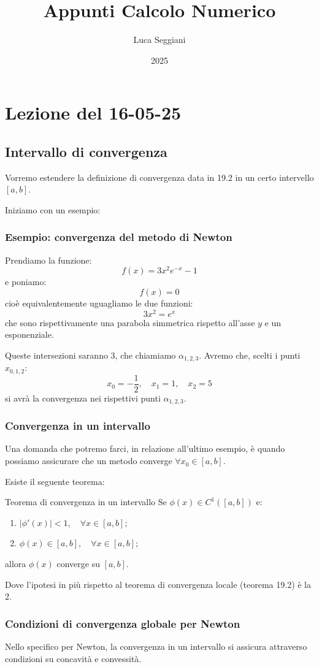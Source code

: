 \documentclass[a4paper,11pt]{article}
\title{Appunti Calcolo Numerico}
\author{Luca Seggiani}
\date{2025}
\begin{document}
\section{Lezione del 16-05-25}

\thispagestyle{empty}
\pagestyle{fancy}


\subsection{Intervallo di convergenza}
Vorremo estendere la definizione di convergenza data in 19.2 in un certo intervello $[a, b]$.

Iniziamo con un esempio:
\subsubsection{Esempio: convergenza del metodo di Newton}
Prendiamo la funzione:
$$
f(x) = 3 x^2 e^{-x} - 1
$$
e poniamo:
$$
f(x) = 0
$$
cioè equivalentemente uguagliamo le due funzioni:
$$
3x^2 = e^x
$$
che sono rispettivamente una parabola simmetrica rispetto all'asse $y$ e un esponenziale.

Queste intersezioni saranno 3, che chiamiamo $\alpha_{1, 2, 3}$.
Avremo che, scelti i punti $x_{0, 1, 2}$:
$$
x_0 = -\frac{1}{2}, \quad x_1 = 1, \quad x_2 = 5
$$
si avrà la convergenza nei rispettivi punti $\alpha_{1, 2, 3}$.

\subsubsection{Convergenza in un intervallo}
Una domanda che potremo farci, in relazione all'ultimo esempio, è quando possiamo assicurare che un metodo converge $\forall x_0 \in [a, b]$.

Esiste il seguente teorema:
\begin{theorem}{Teorema di convergenza in un intervallo}
	Se $\phi(x) \in C^1 ([a, b])$ e:
	\begin{enumerate}
		\item $|\phi'(x)| < 1, \quad \forall x \in [a, b]$;
		\item $\phi(x) \in [a, b], \quad \forall x \in [a, b]$;
	\end{enumerate}
	allora $\phi(x)$ converge su $[a, b]$.
\end{theorem}
Dove l'ipotesi in più rispetto al teorema di convergenza locale (teorema 19.2) è la 2.

\subsubsection{Condizioni di convergenza globale per Newton}
Nello specifico per Newton, la convergenza in un intervallo si assicura attraverso condizioni su concavità e convessità.
\end{document}
